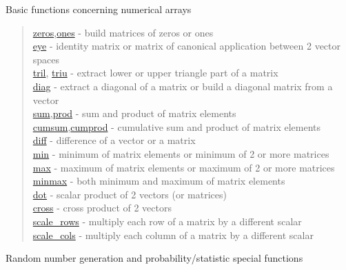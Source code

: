 Basic functions concerning numerical arrays
\begin{quote}
\noindent
\hyperlink{zeros}{zeros},\hyperlink{ones}{ones} - build matrices of zeros or ones \\
\hyperlink{eye}{eye} - identity matrix or matrix of canonical application between 2 vector spaces \\
\hyperlink{tril}{tril}, \hyperlink{triu}{triu} - extract lower or upper triangle part of a matrix \\
\hyperlink{diag}{diag} - extract a diagonal of a matrix or build a diagonal matrix from a vector \\
\hyperlink{sum}{sum},\hyperlink{prod}{prod} - sum and product of matrix elements \\
\hyperlink{cumsum}{cumsum},\hyperlink{cumprod}{cumprod} - cumulative sum and product of matrix elements \\
\hyperlink{diff}{diff} - difference of a vector or a matrix \\
\hyperlink{min}{min} - minimum of matrix elements or minimum of 2 or more matrices \\
\hyperlink{max}{max} - maximum of matrix elements or maximum of 2 or more matrices \\
\hyperlink{minmax}{minmax} - both minimum and maximum of matrix elements\\
\hyperlink{dot}{dot} - scalar product of 2 vectors (or matrices) \\
\hyperlink{cross}{cross} - cross product of 2 vectors \\
\hyperlink{scale_rows}{scale\_rows} - multiply each row of a matrix by a different scalar \\
\hyperlink{scale_cols}{scale\_cols} - multiply each column of a matrix by a different scalar \\
\end{quote}
 

Random number generation and probability/statistic special functions

